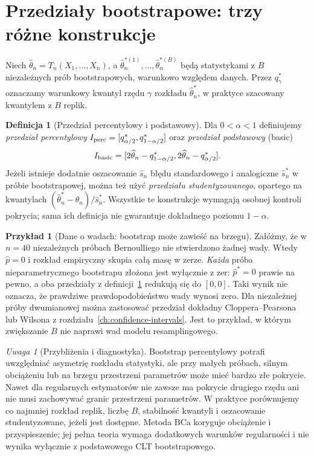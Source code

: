 \documentclass[11pt,a4paper,oneside]{report}
\numberwithin{equation}{chapter}
\theoremstyle{plain}
\theoremstyle{definition}
\newtheorem{definicja}{Definicja}[chapter]
\newtheorem{przyklad}{Przykład}[chapter]
\theoremstyle{remark}
\newtheorem{uwaga}{Uwaga}[chapter]
\begin{document}
\section{Przedziały bootstrapowe: trzy różne konstrukcje}
Niech $\widehat\theta_n=T_n(X_1,\ldots,X_n)$,
a $\widehat\theta_n^{*(1)},\ldots,\widehat\theta_n^{*(B)}$
będą statystykami z $B$ niezależnych prób bootstrapowych,
warunkowo względem danych. Przez $q_\gamma^*$ oznaczamy
warunkowy kwantyl rzędu $\gamma$ rozkładu
$\widehat\theta_n^*$, w praktyce szacowany kwantylem
z $B$ replik.

\begin{definicja}[Przedział percentylowy i podstawowy]
\label{def:bootstrap-intervals}
Dla $0<\alpha<1$ definiujemy \emph{przedział percentylowy}
$I_{\rm perc}=[q_{\alpha/2}^*,q_{1-\alpha/2}^*]$
oraz \emph{przedział podstawowy} (basic)
\[
 I_{\rm basic}=
 [2\widehat\theta_n-q_{1-\alpha/2}^*,
  2\widehat\theta_n-q_{\alpha/2}^*].
\]
Jeżeli istnieje dodatnie oszacowanie $\widehat s_n$ błędu
standardowego i analogiczne $\widehat s_n^*$ w próbie bootstrapowej,
można też użyć \emph{przedziału studentyzowanego},
opartego na kwantylach
$(\widehat\theta_n^*-\widehat\theta_n)/\widehat s_n^*$.
Wszystkie te konstrukcje wymagają osobnej kontroli pokrycia;
sama ich definicja nie gwarantuje dokładnego poziomu $1-\alpha$.
\end{definicja}

\begin{przyklad}[Dane o wadach: bootstrap może zawieść na brzegu]
\label{ex:bootstrap-zero}
Załóżmy, że w $n=40$ niezależnych próbach Bernoulliego
nie stwierdzono żadnej wady. Wtedy $\widehat p=0$
i rozkład empiryczny skupia całą masę w zerze.
\emph{Każda} próba nieparametrycznego bootstrapu złożona
jest wyłącznie z zer: $\widehat p^*=0$ prawie na pewno,
a oba przedziały z definicji~\ref{def:bootstrap-intervals}
redukują się do $[0,0]$. Taki wynik nie oznacza,
że prawdziwe prawdopodobieństwo wady wynosi zero.
Dla niezależnej próby dwumianowej można zastosować
przedział dokładny Cloppera--Pearsona lub Wilsona
z rozdziału~\ref{ch:confidence-intervals}.
Jest to przykład, w którym zwiększanie $B$ nie naprawi
wad modelu resamplingowego.
\end{przyklad}

\begin{uwaga}[Przybliżenia i diagnostyka]
Bootstrap percentylowy potrafi uwzględniać asymetrię rozkładu
statystyki, ale przy małych próbach, silnym obciążeniu lub na
brzegu przestrzeni parametrów może mieć bardzo złe pokrycie.
Nawet dla regularnych estymatorów nie zawsze ma pokrycie
drugiego rzędu ani nie musi zachowywać granic przestrzeni parametrów.
W praktyce porównujemy co najmniej rozkład replik, liczbę $B$,
stabilność kwantyli i oszacowanie studentyzowane, jeżeli jest dostępne.
Metoda BCa koryguje obciążenie i przyspieszenie; jej pełna teoria
wymaga dodatkowych warunków regularności i nie wynika wyłącznie
z podstawowego CLT bootstrapowego.
\end{uwaga}
\end{document}
